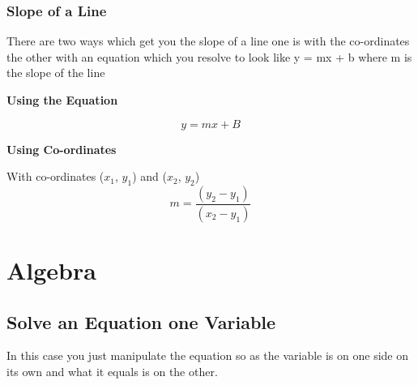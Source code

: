 \documentclass{article}
\begin{document}
 
\newpage
\subsubsection{Slope of a Line}
There are two ways which get you the slope of a line one is with the co-ordinates the other with an equation which you resolve to look like y = mx + b where m is the slope of the line

\textbf{Using the Equation}

\begin{equation}
y = mx + B
\end{equation}

\textbf{Using Co-ordinates}

With co-ordinates ($x_1$, $y_1$) and ($x_2$, $y_2$) 
\begin{equation}
m = \frac{ (y_2 - y_1) }{ (x_2 - y_1) }
\end{equation}


\newpage
\section{Algebra}
\subsection{Solve an Equation one Variable}
In this case you just manipulate the equation so as the variable is on one side on its own and what it equals is on the other.
\end{document}
